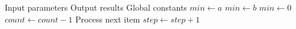 \documentclass{article}
\begin{document}
\begin{algorithm}
\caption{Nested Control Structures}\label{alg:nested}
\begin{algorithmic}[1]
\INPUTS
  \STATE Input parameters
\ENDINPUTS
\OUTPUTS
  \STATE Output results
\ENDOUTPUTS
\GLOBALS
  \STATE Global constants
\BODY
    \STATE $min \gets a$
    \STATE $min \gets b$
  \ELSE
    \STATE $min \gets 0$
  \ENDIF
        \STATE $count \gets count - 1$
      \ENDWHILE
    \ENDFOR
  \ENDFOR
  \LOOP
    \STATE Process next item
  \ENDLOOP
  \REPEAT
    \STATE $step \gets step + 1$
\ENDBODY
\end{algorithmic}
\end{algorithm}
\end{document}
